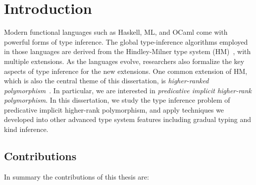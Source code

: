 \chapter{Introduction}


Modern functional languages such as Haskell, ML, and OCaml come with powerful
forms of type inference. The global type-inference algorithms employed in those
languages are derived from the Hindley-Milner type system (HM)~\citep{hindley,
  Damas:Milner}, with multiple extensions. As the languages evolve, researchers
also formalize the key aspects of type inference for the new extensions. One
common extension of HM, which is also the central theme of this dissertation, is
\emph{higher-ranked polymorphism}~\citep{odersky:putting,practical:inference,
  DK}. In particular, we are interested in \textit{predicative implicit
  higher-rank polymorphism}. In this dissertation, we study the type inference
problem of predicative implicit higher-rank polymorphism, and apply techniques
we developed into other advanced type system features including gradual typing
and kind inference.
\section{Contributions}

In summary the contributions of this thesis are:


